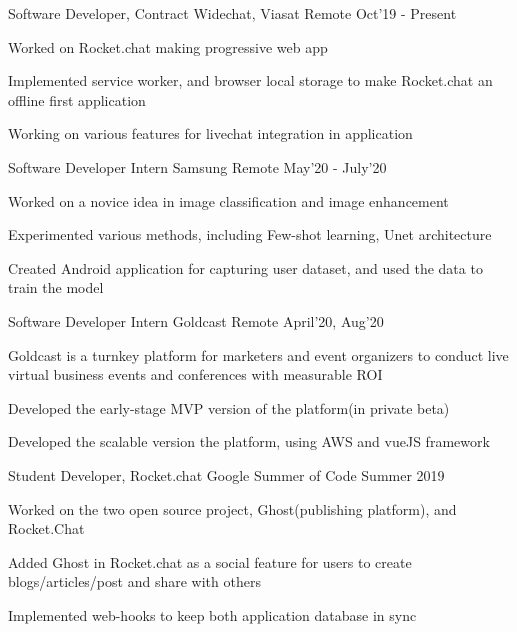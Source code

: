 \begin{cventries}

  \cventry
  {Software Developer, Contract}
  {Widechat, Viasat}
  {Remote}
  {Oct'19 - Present}
  {
    \begin{cvitems}
        \item {Worked on Rocket.chat making progressive web app}
        \item {Implemented service worker, and browser local storage to make Rocket.chat an offline first application}
        \item {Working on various features for livechat integration in application}
    \end{cvitems}
  }

  \cventry
  {Software Developer Intern}
  {Samsung}
  {Remote}
  {May'20 - July'20}
  {
    \begin{cvitems}
        \item {Worked on a novice idea in image classification and image enhancement}
        \item {Experimented various methods, including Few-shot learning, Unet architecture}
        \item {Created Android application for capturing user dataset, and used the data to train the model}
    \end{cvitems}
  }

  \cventry
  {Software Developer Intern}
  {Goldcast}
  {Remote}
  {April'20, Aug'20}
  {
    \begin{cvitems}
        \item {Goldcast is a turnkey platform for marketers and event organizers to conduct live virtual business events and conferences with measurable ROI}
        \item {Developed the early-stage MVP version of the platform(in private beta)}
        \item {Developed the scalable version the platform, using AWS and vueJS framework}
    \end{cvitems}
  }

  \cventry
  {Student Developer, Rocket.chat}
  {Google Summer of Code}
  {}
  {Summer 2019}
  {
    \begin{cvitems}
        \item {Worked on the two open source project, Ghost(publishing platform), and Rocket.Chat}
        \item {Added Ghost in Rocket.chat as a social feature for users to create blogs/articles/post and share with others}
        \item {Implemented web-hooks to keep both application database in sync}
    \end{cvitems}
  }
  

\end{cventries}
